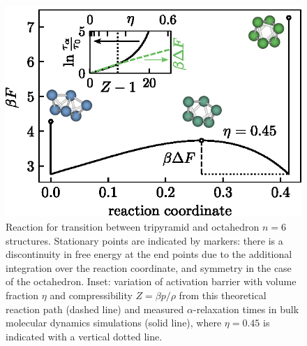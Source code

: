 \documentclass[11pt,twoside]{report}
\begin{document}
\begin{figure}
  \includegraphics[width=0.9\linewidth,outer]{n6-reaction-path}
  \caption[The simplest nontrivial reaction path in hard spheres: octahedron to tripyramid]{
    Reaction for transition between tripyramid and octahedron $n = 6$ structures.
    Stationary points are indicated by markers: there is a discontinuity in free energy at the end points due to the additional integration over the reaction coordinate, and symmetry in the case of the octahedron.
    Inset: variation of activation barrier with volume fraction $\eta$ and compressibility $Z = \beta p/\rho$ from this theoretical reaction path (dashed line) and measured $\alpha$-relaxation times in bulk molecular dynamics simulations (solid line), where $\eta = 0.45$ is indicated with a vertical dotted line.
  }
  \label{fig:reaction-path-6}
\end{figure}
\end{document}
